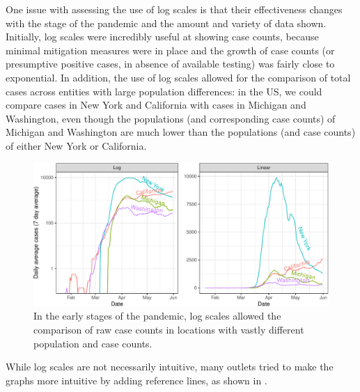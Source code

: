\documentclass[article]{jdssv}\usepackage[]{graphicx}\usepackage[]{xcolor}
\newenvironment{knitrout}{}{} %
\begin{document}
One issue with assessing the use of log scales is that their effectiveness changes with the stage of the pandemic and the amount and variety of data shown. Initially, log scales were incredibly useful at showing case counts, because minimal mitigation measures were in place and the growth of case counts (or presumptive positive cases, in absence of available testing) was fairly close to exponential. In addition, the use of log scales allowed for the comparison of total cases across entities with large population differences: in the US, we could compare cases in New York and California with cases in Michigan and Washington, even though the populations (and corresponding case counts) of Michigan and Washington are much lower than the populations (and case counts) of either New York or California. 

\begin{knitrout}\footnotesize
{}\color{fgcolor}\begin{figure}

{\centering \includegraphics[width=\linewidth]{Figures_R/fig-log-scale-initial-1} 

}

\caption[In the early stages of the pandemic, log scales allowed the comparison of raw case counts in locations with vastly different population and case counts]{In the early stages of the pandemic, log scales allowed the comparison of raw case counts in locations with vastly different population and case counts.}\label{fig:log-scale-initial}
\end{figure}

\end{knitrout}

While log scales are not necessarily intuitive, many outlets tried to make the graphs more intuitive by adding reference lines, as shown in . 
\end{document}
